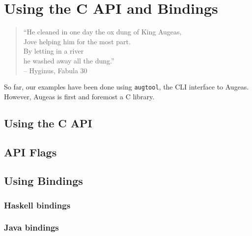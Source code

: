 \chapter{Using the C API and Bindings}

\label{chap:api}
 

\begin{verse}
\begin{flushright}
``He cleaned in one day the ox dung of King Augeas, \\
Jove helping him for the most part. \\
By letting in a river \\
he washed away all the dung.''\\
\bigskip
\small{-- Hyginus, Fabula 30}
\end{flushright}
\end{verse}
\bigskip

So far, our examples have been done using \verb!augtool!, the CLI interface to Augeas. However, Augeas is first and foremost a C library.

\section{Using the C API}


\section{API Flags}

 

\section{Using Bindings}


\subsection{Haskell bindings}


\subsection{Java bindings}


